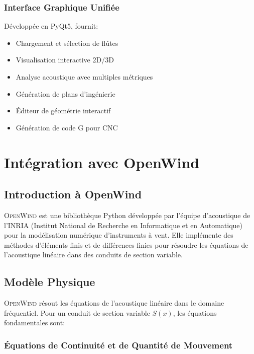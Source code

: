 \documentclass[12pt,a4paper,twocolumn]{article}
\newcommand{\openwind}{\textsc{OpenWind}}
\begin{document}
\subsubsection{Interface Graphique Unifiée}

Développée en PyQt5, fournit:
\begin{itemize}
    \item Chargement et sélection de flûtes
    \item Visualisation interactive 2D/3D
    \item Analyse acoustique avec multiples métriques
    \item Génération de plans d'ingénierie
    \item Éditeur de géométrie interactif
    \item Génération de code G pour CNC
\end{itemize}

\section{Intégration avec OpenWind}

\subsection{Introduction à OpenWind}

\openwind{} est une bibliothèque Python développée par l'équipe d'acoustique de l'INRIA (Institut National de Recherche en Informatique et en Automatique) pour la modélisation numérique d'instruments à vent. Elle implémente des méthodes d'éléments finis et de différences finies pour résoudre les équations de l'acoustique linéaire dans des conduits de section variable.

\subsection{Modèle Physique}

\openwind{} résout les équations de l'acoustique linéaire dans le domaine fréquentiel. Pour un conduit de section variable $S(x)$, les équations fondamentales sont:

\subsubsection{Équations de Continuité et de Quantité de Mouvement}
\end{document}
